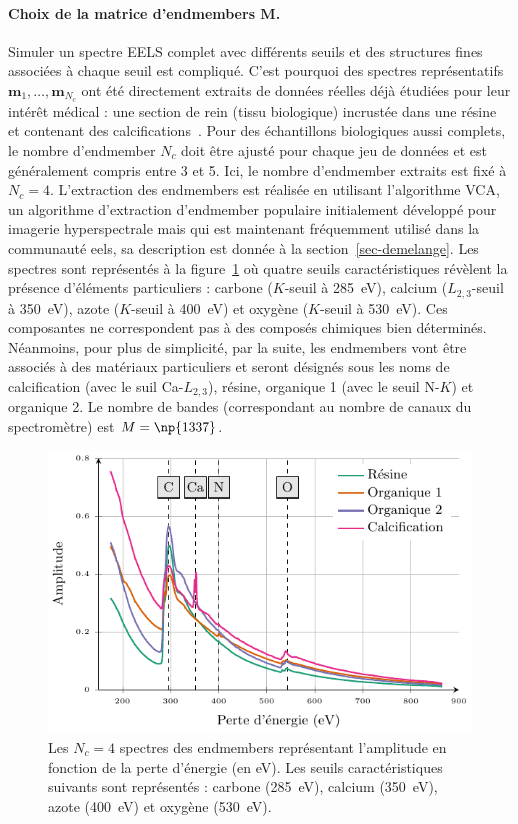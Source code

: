 \paragraph{Choix de la matrice d'endmembers $\mathbf{M}$.} Simuler un spectre EELS complet avec différents seuils et des structures fines associées à chaque seuil est compliqué. C'est pourquoi des spectres représentatifs $\mathbf{m}_1,\dots,\mathbf{m}_{N_c}$ ont été directement extraits de données réelles déjà étudiées pour leur intérêt médical : une section de rein (tissu biologique) incrustée dans une résine et contenant des calcifications~\cite{gay2020nanoscale}. Pour des échantillons biologiques aussi complets, le nombre d'endmember $N_c$ doit être ajusté pour chaque jeu de données et est généralement compris entre 3 et 5. Ici, le nombre d'endmember extraits est fixé à $N_c=4$. L'extraction des endmembers est réalisée en utilisant l'algorithme VCA, un algorithme d'extraction d'endmember populaire initialement développé pour imagerie hyperspectrale mais qui est maintenant fréquemment utilisé dans la communauté \gls{eels}, sa description est donnée à la section~\ref{sec-demelange}.
%
Les spectres sont représentés à la figure~\ref{fig-spectres-synth} où quatre seuils caractéristiques révèlent la présence d'éléments particuliers : carbone ($K$-seuil à 285~eV), calcium ($L_{2,3}$-seuil à 350~eV), azote ($K$-seuil à 400~eV) et oxygène ($K$-seuil à 530~eV). Ces composantes ne correspondent pas à des composés chimiques bien déterminés. Néanmoins, pour plus de simplicité, par la suite, les endmembers vont être associés à des matériaux particuliers et seront désignés sous les noms de calcification (avec le suil Ca-$L_{2, 3}$), résine, organique 1 (avec le seuil N-$K$) et organique 2. Le nombre de bandes (correspondant au nombre de canaux du spectromètre) est $M=\np{1337}$.


\begin{figure}[h!]
    \centering
    \includegraphics{img/chapitre3/figure4/endmember_spectra.pdf}
    \caption{Les $N_c=4$ spectres des endmembers représentant l'amplitude en fonction de la perte d'énergie (en eV). Les seuils caractéristiques suivants sont représentés : carbone (285~eV), calcium (350~eV), azote (400~eV) et oxygène (530~eV).
        \protect\label{fig-spectres-synth}}
\end{figure}


